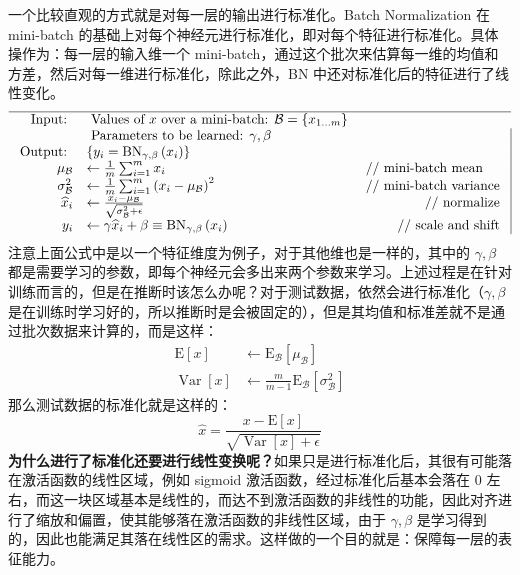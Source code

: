 一个比较直观的方式就是对每一层的输出进行标准化。Batch Normalization 在 mini-batch 的基础上对每个神经元进行标准化，即对每个特征进行标准化。具体操作为：每一层的输入维一个 mini-batch，通过这个批次来估算每一维的均值和方差，然后对每一维进行标准化，除此之外，BN 中还对标准化后的特征进行了线性变化。
$$
\begin{array}{rlr|}
	\hline \text { Input: } & \text { Values of } x \text { over a mini-batch: } \mathcal{B}=\left\{x_{1 \ldots m}\right\} \\
	& \text { Parameters to be learned: } \gamma, \beta & \\
	\text { Output: } & \left\{y_{i}=\operatorname{BN}_{\gamma, \beta}\left(x_{i}\right)\right\} & \\
	\mu_{\mathcal{B}} & \leftarrow \frac{1}{m} \sum_{i=1}^{m} x_{i} & \multicolumn{1}{l|}{\text { // mini-batch mean }} \\
	\sigma_{\mathcal{B}}^{2} & \leftarrow \frac{1}{m} \sum_{i=1}^{m}\left(x_{i}-\mu_{\mathcal{B}}\right)^{2} & \text { // mini-batch variance } \\
	\widehat{x}_{i} & \leftarrow \frac{x_{i}-\mu_{\mathcal{B}}}{\sqrt{\sigma_{\mathcal{B}}^{2}+\epsilon}} & \text { // normalize } \\
	y_{i} & \leftarrow \gamma \widehat{x}_{i}+\beta \equiv \mathrm{BN}_{\gamma, \beta}\left(x_{i}\right) & \text { // scale and shift }
\end{array}
$$
注意上面公式中是以一个特征维度为例子，对于其他维也是一样的，其中的 $\gamma, \beta$ 都是需要学习的参数，即每个神经元会多出来两个参数来学习。上述过程是在针对训练而言的，但是在推断时该怎么办呢？对于测试数据，依然会进行标准化（$\gamma, \beta$ 是在训练时学习好的，所以推断时是会被固定的），但是其均值和标准差就不是通过批次数据来计算的，而是这样：
$$
\begin{aligned}
	\mathrm{E}[x] & \leftarrow \mathrm{E}_{\mathcal{B}}\left[\mu_{\mathcal{B}}\right] \\
	\operatorname{Var}[x] & \leftarrow \frac{m}{m-1} \mathrm{E}_{\mathcal{B}}\left[\sigma_{\mathcal{B}}^{2}\right]
\end{aligned}
$$
那么测试数据的标准化就是这样的：
$$
\widehat{x}=\frac{x-\mathrm{E}[x]}{\sqrt{\operatorname{Var}[x]+\epsilon}}
$$
\textbf{为什么进行了标准化还要进行线性变换呢？}如果只是进行标准化后，其很有可能落在激活函数的线性区域，例如 sigmoid 激活函数，经过标准化后基本会落在 0 左右，而这一块区域基本是线性的，而达不到激活函数的非线性的功能，因此对齐进行了缩放和偏置，使其能够落在激活函数的非线性区域，由于 $\gamma, \beta$ 是学习得到的，因此也能满足其落在线性区的需求。这样做的一个目的就是：保障每一层的表征能力。

